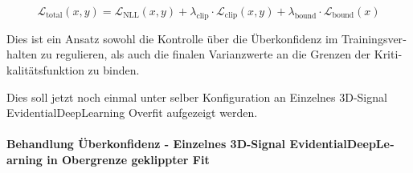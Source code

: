 \begin{otherlanguage}{ngerman}
\begin{equation}
\mathcal{L}_{\text{total}}(x, y) = \mathcal{L}_{\text{NLL}}(x, y) + \lambda_{\text{clip}} \cdot \mathcal{L}_{\text{clip}}(x, y) + \lambda_{\text{bound}} \cdot \mathcal{L}_{\text{bound}}(x)
\end{equation}

Dies ist ein Ansatz sowohl die Kontrolle über die Überkonfidenz im Trainingsverhalten zu regulieren, als auch die finalen Varianzwerte an die Grenzen der Kritikalitätsfunktion zu binden.

Dies soll jetzt noch einmal unter selber Konfiguration an \glqq{}Einzelnes 3D-Signal \gls{EvidentialDeepLearning} Overfit\grqq{} aufgezeigt werden.



\paragraph{Behandlung Überkonfidenz - \glqq{}Einzelnes 3D-Signal \gls{EvidentialDeepLearning} in Obergrenze geklippter Fit\grqq{}}









\end{otherlanguage}
